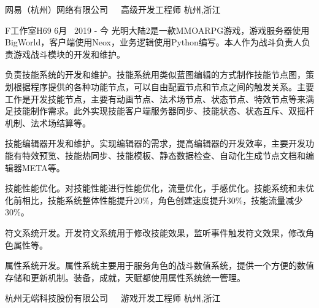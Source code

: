 


\begin{cventries}

\cventrycompany
{网易（杭州）网络有限公司~~~高级开发工程师} %
{杭州,浙江} %

\cventryproject
{F工作室H69} %
{6月~ 2019 - 今} %
{光明大陆2是一款MMOARPG游戏，游戏服务器使用BigWorld，客户端使用Neox，业务逻辑使用Python编写。本人作为战斗负责人负责游戏战斗模块的开发和维护。}
{ %
	\begin{cvitems}
		\item {负责技能系统的开发和维护。技能系统用类似蓝图编辑的方式制作技能节点图，策划根据程序提供的各种功能节点，可以自由配置节点和节点之间的触发关系。主要工作是开发技能节点，主要有动画节点、法术场节点、状态节点、特效节点等来满足技能制作需求。此外实现技能客户端服务器同步、技能状态、状态互斥、双摇杆机制、法术场结算等。}
		\item{技能编辑器开发和维护。实现编辑器的需求，提高编辑器的开发效率，主要开发功能有特效预览、技能热同步、技能模板、静态数据检查、自动化生成节点文档和编辑器META等。}
		\item{技能性能优化。对技能性能进行性能优化，流量优化，手感优化。技能系统和未优化前相比，技能系统整体性能提升20\%，角色创建速度提升30\%，技能流量减少30\%。}
		\item{符文系统开发。开发符文系统用于修改技能效果，监听事件触发符文效果，修改角色属性等。}
		\item{属性系统开发。属性系统主要用于服务角色的战斗数值系统，提供一个方便的数值存储和更新机制。装备，成就，天赋都使用属性系统统一管理。}
	\end{cvitems}
}


\cventrycompany
{杭州无端科技股份有限公司~~~游戏开发工程师} %
{杭州,浙江} %


\end{cventries}
